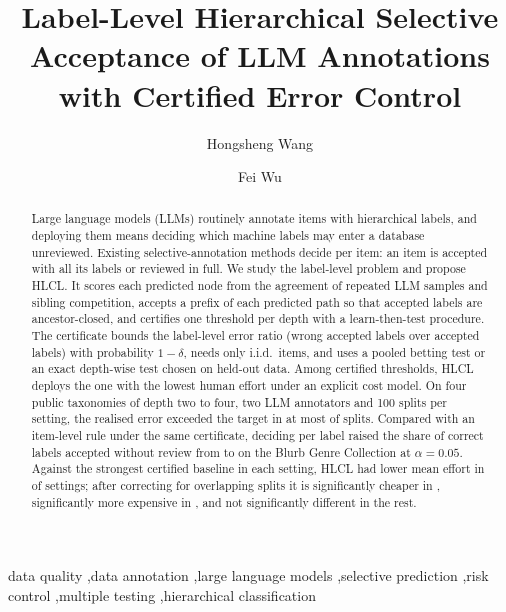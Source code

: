 \documentclass[preprint,12pt]{elsarticle}
\theoremstyle{definition}
\theoremstyle{remark}
\newcommand{\hlcl}{\textup{\textsc{HLCL}}}
\begin{document}
\begin{frontmatter}

\title{Label-Level Hierarchical Selective Acceptance of LLM Annotations with
Certified Error Control}

\author[zju,loctek]{Hongsheng Wang}
\author[zju]{Fei Wu}

\begin{abstract}
Large language models (LLMs) routinely annotate items with hierarchical labels,
and deploying them means deciding which machine labels may enter a database
unreviewed. Existing selective-annotation methods decide per item: an item is
accepted with all its labels or reviewed in full. We study the label-level
problem and propose \hlcl{}. It scores each predicted node from the agreement
of repeated LLM samples and sibling competition, accepts a prefix of each
predicted path so that accepted labels are ancestor-closed, and certifies one
threshold per depth with a learn-then-test procedure. The certificate bounds
the label-level error ratio (wrong accepted labels over accepted labels) with
probability $1-\delta$, needs only i.i.d.\ items, and uses a pooled betting test
or an exact depth-wise test chosen on held-out data. Among certified thresholds, \hlcl{} deploys the one with the
lowest human effort under an explicit cost model. On four public taxonomies
of depth two to four, two LLM annotators and 100 splits per setting, the realised
error exceeded the target in at most  of splits. Compared
with an item-level rule under the same certificate, deciding per label raised
the share of correct labels accepted without review from
 to  on the Blurb
Genre Collection at $\alpha=0.05$. Against the strongest certified baseline in
each setting, \hlcl{} had lower mean effort in  of
 settings; after correcting for overlapping splits it is
significantly cheaper in , significantly more expensive in
, and not significantly different in the rest.
\end{abstract}

\begin{keyword}
data quality \sep data annotation \sep large language models \sep selective
prediction \sep risk control \sep multiple testing \sep hierarchical
classification
\end{keyword}

\end{frontmatter}
\end{document}
